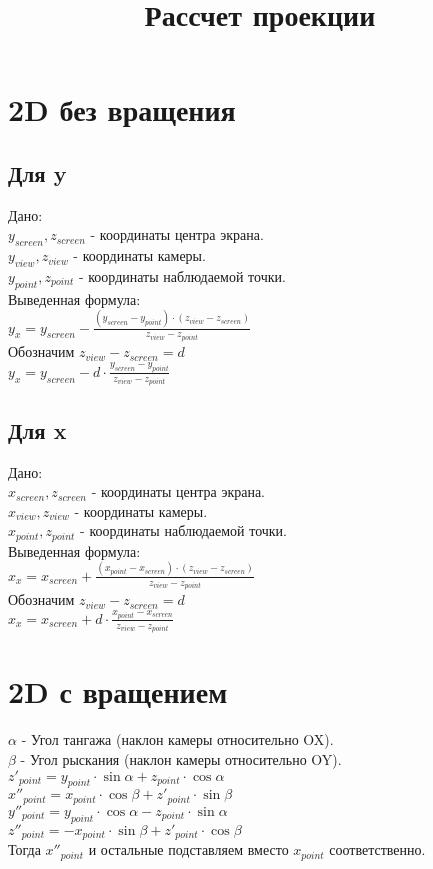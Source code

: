 

\title{Рассчет проекции}


\maketitle

\section{2D без вращения}
\subsection{Для y}
Дано: \\
$y_{screen}, z_{screen}$ - координаты центра экрана. \\
$y_{view}, z_{view}$ - координаты камеры. \\
$y_{point}, z_{point}$ - координаты наблюдаемой точки. \\
Выведенная формула: \\
$y_x = y_{screen} - \frac{ (y_{screen} - y_{point}) \cdot (z_{view} - z_{screen})}{ z_{view} - z_{point} }$ \\
Обозначим $z_{view} - z_{screen} = d$ \\
$y_x = y_{screen} - d \cdot \frac{ y_{screen} - y_{point}}{ z_{view} - z_{point} }$

\subsection{Для x}
Дано: \\
$x_{screen}, z_{screen}$ - координаты центра экрана. \\
$x_{view}, z_{view}$ - координаты камеры. \\
$x_{point}, z_{point}$ - координаты наблюдаемой точки. \\
Выведенная формула: \\
$x_x = x_{screen} + \frac{ (x_{point} - x_{screen}) \cdot (z_{view} - z_{screen})}{ z_{view} - z_{point} }$ \\
Обозначим $z_{view} - z_{screen} = d$ \\
$x_x = x_{screen} + d \cdot \frac{ x_{point} - x_{screen}}{ z_{view} - z_{point} }$ 

\section{2D с вращением}
$\alpha$ - Угол тангажа (наклон камеры относительно OX).  \\
$\beta$ - Угол рыскания (наклон камеры относительно OY). \\
$z'_{point} = y_{point} \cdot \sin{\alpha} + z_{point} \cdot \cos{\alpha}$ \\
$x''_{point} = x_{point} \cdot \cos{\beta} + z'_{point} \cdot \sin{\beta}$ \\
$y''_{point} = y_{point} \cdot \cos{\alpha} - z_{point} \cdot \sin{\alpha}$ \\
$z''_{point} = -x_{point} \cdot \sin{\beta} + z'_{point} \cdot \cos{\beta}$ \\
Тогда $x''_{point}$ и остальные подставляем вместо $x_{point}$ соответственно.


